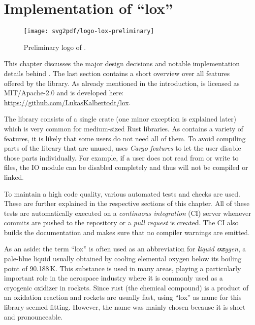 \chapter{Implementation of \enquote{lox}}

\vspace{-8mm}
\begin{figure}[h]
  \centering
  \texttt{[image: svg2pdf/logo-lox-preliminary]}
  \caption{Preliminary logo of .}
\end{figure}
\vspace{8mm}

This chapter discusses the major design decisions and notable implementation details behind .
The last section contains a short overview over all features offered by the library. As already mentioned in the introduction,  is licensed as MIT/Apache-2.0 and is developed here: \url{https://github.com/LukasKalbertodt/lox}.

The library consists of a single crate (one minor exception is explained later) which is very common for medium-sized Rust libraries.
As  contains a variety of features, it is likely that some users do not need all of them.
To avoid compiling parts of the library that are unused,  uses \emph{Cargo features} to let the user disable those parts individually.
For example, if a user does not read from or write to files, the IO module can be disabled completely and thus will not be compiled or linked.

To maintain a high code quality, various automated tests and checks are used.
These are further explained in the respective sections of this chapter.
All of these tests are automatically executed on a \emph{continuous integration} (CI) server whenever commits are pushed to the repository or a \emph{pull request} is created.
The CI also builds the documentation and makes sure that no compiler warnings are emitted.


\vfill
\begin{center}
  \begin{minipage}{.9\textwidth}
    \small
    As an aside:
    the term \enquote{lox} is often used as an abbreviation for \emph{\textbf{l}iquid \textbf{ox}ygen}, a pale-blue liquid usually obtained by cooling elemental oxygen below its boiling point of 90.188\,K.
    This substance is used in many areas, playing a particularly important role in the aerospace industry where it is commonly used as a cryogenic oxidizer in rockets.
    Since rust (the chemical compound\footnotemark) is a product of an oxidation reaction and rockets are usually fast, using \enquote{lox} as name for this library seemed fitting.
    However, the name was mainly chosen because it is short and pronounceable.
  \end{minipage}
\end{center}


\newpage


\newpage


\newpage


\newpage


\newpage

